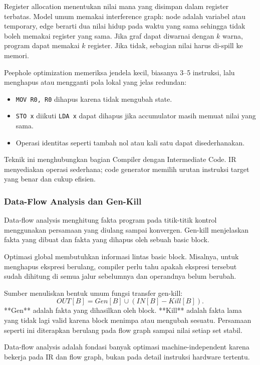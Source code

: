 Register allocation menentukan nilai mana yang disimpan dalam register terbatas. Model umum memakai interference graph: node adalah variabel atau temporary, edge berarti dua nilai hidup pada waktu yang sama sehingga tidak boleh memakai register yang sama. Jika graf dapat diwarnai dengan $k$ warna, program dapat memakai $k$ register. Jika tidak, sebagian nilai harus di-spill ke memori.

Peephole optimization memeriksa jendela kecil, biasanya 3--5 instruksi, lalu menghapus atau mengganti pola lokal yang jelas redundan:
\begin{itemize}
    \item \texttt{MOV R0, R0} dihapus karena tidak mengubah state.
    \item \texttt{STO x} diikuti \texttt{LDA x} dapat dihapus jika accumulator masih memuat nilai yang sama.
    \item Operasi identitas seperti tambah nol atau kali satu dapat disederhanakan.
\end{itemize}

Teknik ini menghubungkan bagian Compiler dengan Intermediate Code. IR menyediakan operasi sederhana; code generator memilih urutan instruksi target yang benar dan cukup efisien.

\subsubsection{Data-Flow Analysis dan Gen-Kill}

\begin{jawab}
Data-flow analysis menghitung fakta program pada titik-titik kontrol menggunakan persamaan yang diulang sampai konvergen. Gen-kill menjelaskan fakta yang dibuat dan fakta yang dihapus oleh sebuah basic block.
\end{jawab}

Optimasi global membutuhkan informasi lintas basic block. Misalnya, untuk menghapus ekspresi berulang, compiler perlu tahu apakah ekspresi tersebut sudah dihitung di semua jalur sebelumnya dan operandnya belum berubah.

Sumber menuliskan bentuk umum fungsi transfer gen-kill:
\[
    OUT[B]=Gen[B]\cup(IN[B]-Kill[B]).
\]
**Gen** adalah fakta yang dihasilkan oleh block. **Kill** adalah fakta lama yang tidak lagi valid karena block menimpa atau mengubah sesuatu. Persamaan seperti ini diterapkan berulang pada flow graph sampai nilai setiap set stabil.

Data-flow analysis adalah fondasi banyak optimasi machine-independent karena bekerja pada IR dan flow graph, bukan pada detail instruksi hardware tertentu.

